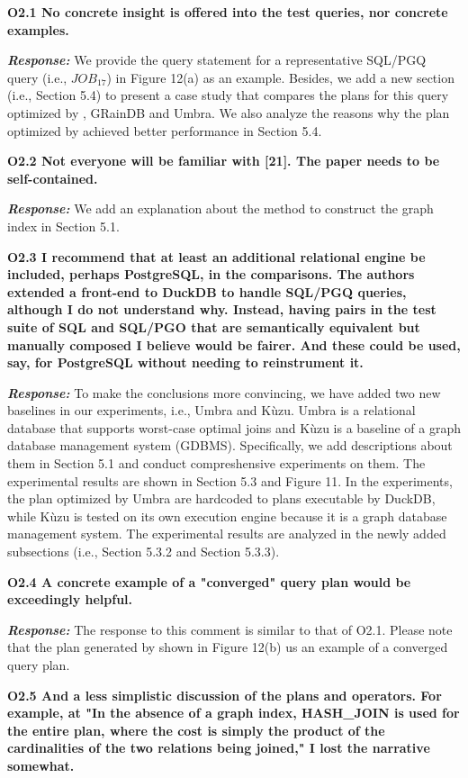 \textbf{O2.1 No concrete insight is offered into the test queries, nor concrete examples. }

\textbf{\textit{Response: }}
We provide the query statement for a representative SQL/PGQ query (i.e., $JOB_{17}$) in Figure 12(a) as an example.
Besides, we add a new section (i.e., Section 5.4) to present a case study that compares the plans for this query optimized by \name, GRainDB and Umbra.
We also analyze the reasons why the plan optimized by \name achieved better performance in Section 5.4.


\textbf{
O2.2 Not everyone will be familiar with [21]. The paper needs to be self-contained. }

\textbf{\textit{Response: }}
We add an explanation about the method to construct the graph index in Section 5.1.

\textbf{ 
O2.3 I recommend that at least an additional relational engine be included, perhaps PostgreSQL, in the comparisons. The authors extended a front-end to DuckDB to handle SQL/PGQ queries, although I do not understand why. Instead, having pairs in the test suite of SQL and SQL/PGO that are semantically equivalent but manually composed I believe would be fairer. And these could be used, say, for PostgreSQL without needing to reinstrument it.}

\textbf{\textit{Response: }}
To make the conclusions more convincing, we have added two new baselines in our experiments, i.e., Umbra and K\`uzu.
Umbra is a relational database that supports worst-case optimal joins and K\`uzu is a baseline of a graph database management system (GDBMS).
Specifically, we add descriptions about them in Section 5.1 and conduct compreshensive experiments on them.
The experimental results are shown in Section 5.3 and Figure 11.
In the experiments, the plan optimized by Umbra are hardcoded to plans executable by DuckDB, while K\`uzu is tested on its own execution engine because it is a graph database management system.
The experimental results are analyzed in the newly added subsections (i.e., Section 5.3.2 and Section 5.3.3).


\textbf{
O2.4 A concrete example of a "converged" query plan would be exceedingly helpful.} 

\textbf{\textit{Response: }} 
The response to this comment is similar to that of O2.1.
Please note that the plan generated by \name shown in Figure 12(b) us an example of a converged query plan.

\textbf{
O2.5 And a less simplistic discussion of the plans and operators. For example, at "In the absence of a graph index, HASH\_JOIN is used for the entire plan, where the cost is simply the product of the cardinalities of the two relations being joined," I lost the narrative somewhat. }

